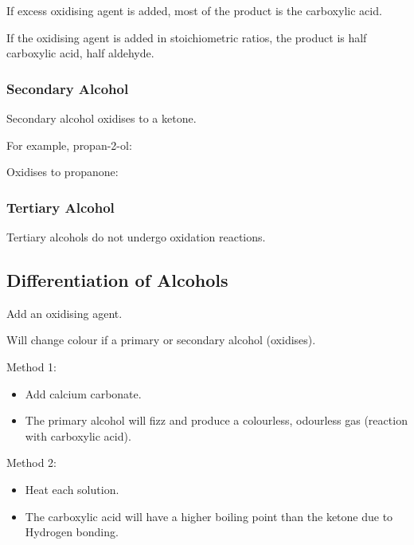 \documentclass[a4paper,11pt]{article}
\begin{document}
If excess oxidising agent is added, most of the product is the carboxylic acid.

If the oxidising agent is added in stoichiometric ratios, the product is half
carboxylic acid, half aldehyde.


\subsubsection{Secondary Alcohol}

Secondary alcohol oxidises to a ketone.

For example, propan-2-ol:

\begin{center}
\end{center}

Oxidises to propanone:

\begin{center}
\end{center}


\subsubsection{Tertiary Alcohol}

Tertiary alcohols do not undergo oxidation reactions.


\subsection{Differentiation of Alcohols}

Add an oxidising agent.

Will change colour if a primary or secondary alcohol (oxidises).

Method 1:

\begin{itemize}
\item Add calcium carbonate.
\item The primary alcohol will fizz and produce a colourless, odourless gas
	(reaction with carboxylic acid).
\end{itemize}

Method 2:

\begin{itemize}
\item Heat each solution.
\item The carboxylic acid will have a higher boiling point than the ketone due
	to Hydrogen bonding.
\end{itemize}
\end{document}
